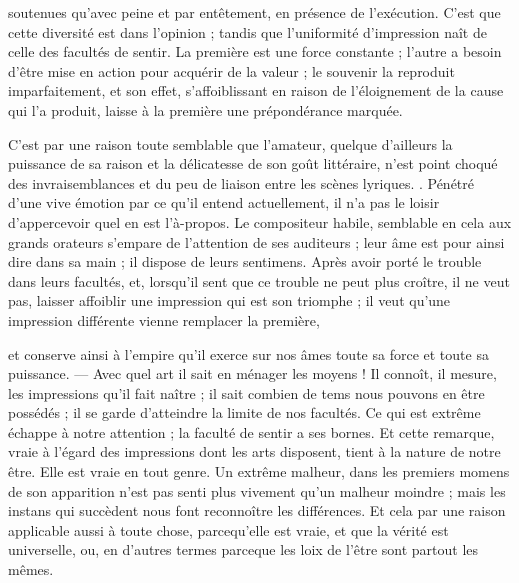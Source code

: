 \documentclass[11pt,a4paper]{article}
\begin{document}

soutenues qu'avec peine et par  entêtement, en présence de
l'exécution. C'est que cette diversité est  dans l'opinion ;
tandis que l'uniformité d'impression  naît de celle des facultés de
sentir. La première est une force constante ; l'autre a besoin d'être mise en
action pour acquérir  de la valeur ; le souvenir la reproduit
imparfaitement, et son effet, s'affoiblissant en raison de l'éloignement de la
cause qui l'a produit, laisse à la première  une prépondérance
marquée.

C'est par une raison toute semblable que l'amateur, quelque 
d'ailleurs la puissance de sa raison et la délicatesse de son goût littéraire,
n'est point choqué des invraisemblances et du peu de liaison entre les
 scènes lyriques. .
Pénétré d'une vive émotion  par ce qu'il entend actuellement, il
n'a pas le loisir d'appercevoir quel en est l'à-propos. Le compositeur habile,
semblable en cela aux grands orateurs s'empare de l'attention de ses
auditeurs ; leur âme est pour ainsi dire dans sa main ; il dispose de leurs
sentimens. Après avoir porté le trouble dans leurs facultés, et, lorsqu'il sent
que ce trouble ne peut plus croître, il ne veut pas, 
laisser affoiblir une impression qui est son triomphe ; il 
veut qu'une impression différente vienne remplacer la première,


et conserve ainsi à l'empire qu'il exerce sur nos âmes toute sa force et toute
sa puissance. — Avec quel art il sait en ménager les moyens ! Il connoît,
 il mesure, les impressions qu'il fait naître ; il sait
combien de tems nous pouvons en être possédés ; il se garde d'atteindre la
limite de nos facultés. Ce qui est extrême échappe à notre attention ; la
faculté de sentir a ses bornes. Et cette remarque, vraie à l'égard des
impressions dont les arts disposent, tient à la nature de notre être. Elle est
vraie en tout genre. Un extrême malheur, dans les premiers momens de son
apparition n'est pas senti plus vivement qu'un malheur moindre ; mais les
instans qui succèdent nous font reconnoître les différences. 
Et cela par une raison applicable aussi à toute chose, parcequ'elle est vraie,
et que la vérité est universelle, ou, en d'autres termes  parceque les loix de l'être sont partout les mêmes.
\end{document}
